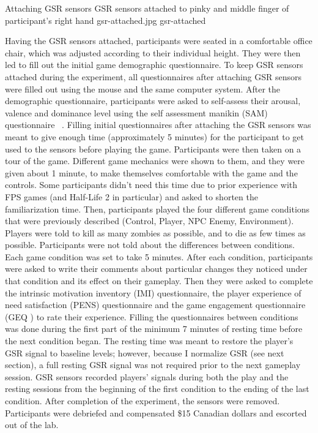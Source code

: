 \img
{Attaching GSR sensors}
{GSR sensors attached to pinky and middle finger of participant's right hand}
{gsr-attached.jpg}
{gsr-attached}

Having the GSR sensors attached, participants were seated in a comfortable office chair, which was adjusted according to their individual height. They were then led to fill out the initial game demographic questionnaire. To keep GSR sensors attached during the experiment, all questionnaires after attaching GSR sensors were filled out using the mouse and the same computer system. After the demographic questionnaire, participants were asked to self-assess their arousal, valence and dominance level using the self assessment manikin (SAM) questionnaire ~\cite{bradley1994measuring}. Filling initial questionnaires after attaching the GSR sensors was meant to give enough time (approximately 5 minutes) for the participant to get used to the sensors before playing the game. Participants were then taken on a tour of the game. Different game mechanics were shown to them, and they were given about 1 minute, to make themselves comfortable with the game and the controls. Some participants didn't need this time due to prior experience with FPS games (and Half-Life 2 in particular) and asked to shorten the familiarization time. Then, participants played the four different game conditions that were previously described (Control, Player, NPC Enemy, Environment). Players were told to kill as many zombies as possible, and to die as few times as possible. Participants were not told about the differences between conditions. Each game condition was set to take 5 minutes. After each condition, participants were asked to write their comments about particular changes they noticed under that condition and its effect on their gameplay. Then they were asked to complete the intrinsic motivation inventory (IMI) questionnaire, the player experience of need satisfaction (PENS) questionnaire and the game engagement questionnaire (GEQ ) to rate their experience. Filling the questionnaires between conditions was done during the first part of the minimum 7 minutes of resting time before the next condition began. The resting time was meant to restore the player's GSR signal to baseline levels; however, because I normalize GSR (see next section), a full resting GSR signal was not required prior to the next gameplay session. GSR sensors recorded players' signals during both the play and the resting sessions from the beginning of the first condition to the ending of the last condition. After completion of the experiment, the sensors were removed. Participants were debriefed and compensated \$15 Canadian dollars and escorted out of the lab.

